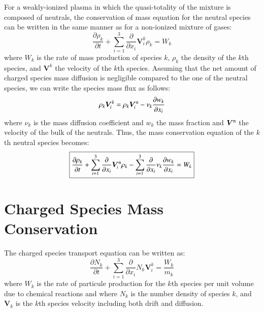 \documentclass{warpdoc}
\newcommand\frameeqn[1]{\fbox{$\displaystyle #1$}}
\renewcommand{\vec}[1]{\bm{#1}}
\begin{document}
For a weakly-ionized plasma in which the quasi-totality of the mixture is composed of neutrals, the conservation of mass equation for the neutral species can be written in the same manner as for a non-ionized mixture of gases:
%
\begin{equation}
  \frac{\partial \rho_k}{\partial t} + \sum_{i=1}^3 \frac{\partial}{\partial x_i} \vec{V}_i^{k} \rho_k = W_k
\end{equation}
%
where $W_k$ is the rate of mass production of species $k$, $\rho_k$ the density of the $k$th species, and $\vec{V}^{k}$ the velocity of the $k$th species. Assuming that the net amount of charged species mass diffusion is negligible compared to the one of the neutral species, we can write the species mass flux as follows:
%
\begin{equation}
\rho_k \vec{V}^k_i=\rho_k \vec{V}^{\rm n}_i - \nu_k \frac{\partial w_k}{\partial x_i}
\end{equation}
%  
where $\nu_k$ is the mass diffusion coefficient and $w_k$ the mass fraction and $\vec{V}^{\rm n}$ the velocity of the bulk of the neutrals. Thus, the mass conservation equation of the $k$th neutral species becomes:
%
\begin{equation}
\frameeqn{
  \frac{\partial \rho_k}{\partial t} + \sum_{i=1}^3 \frac{\partial}{\partial x_i} \vec{V}_i^{\rm n} \rho_k 
- \sum_{i=1}^3 \frac{\partial}{\partial x_i} \nu_k \frac{\partial w_k}{\partial x_i}= W_k
}
\label{eqn:massneutral}
\end{equation}
%






\section{Charged Species Mass Conservation}

The charged species transport equation can be written as:
%
\begin{equation}
  \frac{\partial N_k}{\partial t} + \sum_{i=1}^3 \frac{\partial}{\partial x_i} N_k \vec{V}_i^k = \frac{W_k}{m_k}
\end{equation}
%
where $W_k$ is the rate of particule production for the $k$th species per unit volume due to chemical reactions and where $N_k$ is the number density of species $k$, and $\vec{V}_k$ is the $k$th species velocity including both drift and diffusion.
\end{document}
